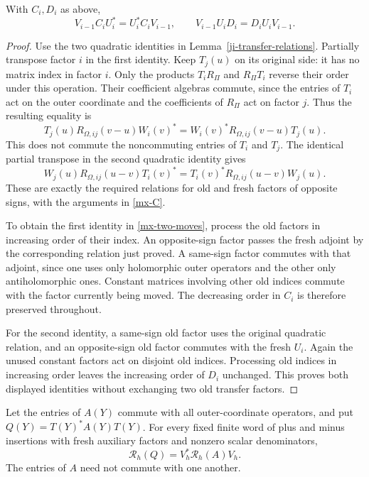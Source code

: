 \begin{lemma}\label{mx-transfer-moves}
With \(C_i,D_i\) as above,
\begin{equation}\label{mx-two-moves}
          V_{i-1}C_iU_i^*=U_i^*C_iV_{i-1},
       \qquad V_{i-1}U_iD_i=D_iU_iV_{i-1}.
\end{equation}
\end{lemma}

\begin{proof}
Use the two quadratic identities in
Lemma~\ref{ji-transfer-relations}.
Partially transpose factor \(i\) in the first identity.  Keep
\(T_j(u)\) on its original side: it has no matrix index in
factor \(i\).  Only the products \(T_iR_\Pi\) and
\(R_\Pi T_i\) reverse their order under this operation.
Their coefficient algebras commute, since the entries of \(T_i\)
act on the outer coordinate and the coefficients of \(R_\Pi\)
act on factor \(j\).  Thus the resulting equality is
\[
 T_j(u)R_{\Omega,ij}(v-u)W_i(v)^*
                  =W_i(v)^*R_{\Omega,ij}(v-u)T_j(u).
\]
This does not commute the noncommuting entries of \(T_i\)
and \(T_j\).  The identical partial transpose in the second
quadratic identity gives
\[
 W_j(u)R_{\Omega,ij}(u-v)T_i(v)^*
                  =T_i(v)^*R_{\Omega,ij}(u-v)W_j(u).
\]
These are exactly the required relations for old and fresh factors
of opposite signs, with the arguments in \eqref{mx-C}.

To obtain the first identity in \eqref{mx-two-moves}, process the
old factors in increasing order of their index.  An opposite-sign
factor passes the fresh adjoint by the corresponding relation just
proved.  A same-sign factor commutes with that adjoint, since one
uses only holomorphic outer operators and the other only
antiholomorphic ones.  Constant matrices involving other old
indices commute with the factor currently being moved.  The
decreasing order in \(C_i\) is therefore preserved throughout.

For the second identity, a same-sign old factor uses the original
quadratic relation, and an opposite-sign old factor commutes with
the fresh \(U_i\).  Again the unused constant factors act on
disjoint old indices.  Processing old indices in increasing order
leaves the increasing order of \(D_i\) unchanged.  This proves
both displayed identities without exchanging two old transfer
factors.
\end{proof}

\begin{theorem}\label{ji-fused-congruence}
Let the entries of \(A(Y)\) commute with all outer-coordinate
operators, and put \(Q(Y)=T(Y)^*A(Y)T(Y)\).  For every fixed
finite word of plus and minus insertions with fresh auxiliary
factors and nonzero scalar denominators,
\begin{equation}\label{mx-full-congruence}
              \mathcal R_h(Q)=V_h^*\mathcal R_h(A)V_h.
\end{equation}
The entries of \(A\) need not commute with one another.
\end{theorem}

